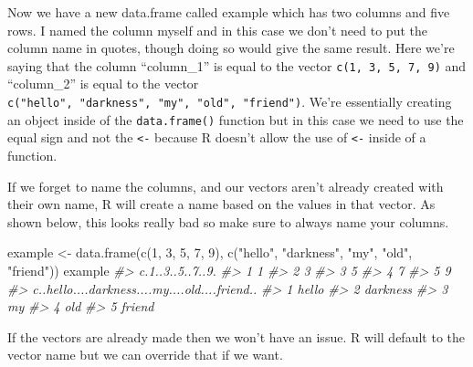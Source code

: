 \documentclass[
]{krantz}
\makeatletter
\newenvironment{Shaded}{\begin{snugshade}}{\end{snugshade}}
\newcommand{\CommentTok}[1]{\textcolor[rgb]{0.37,0.37,0.37}{\textit{#1}}}
\newcommand{\DecValTok}[1]{\textcolor[rgb]{0.06,0.06,0.06}{#1}}
\newcommand{\FunctionTok}[1]{\textcolor[rgb]{0,0,0}{#1}}
\newcommand{\NormalTok}[1]{#1}
\newcommand{\OtherTok}[1]{\textcolor[rgb]{0.37,0.37,0.37}{#1}}
\newcommand{\StringTok}[1]{\textcolor[rgb]{0.5,0.5,0.5}{#1}}
\newenvironment{kframe}{%
\medskip{}
\setlength{\fboxsep}{.8em}
 \def\at@end@of@kframe{}%
 \ifinner\ifhmode%
  \def\at@end@of@kframe{\end{minipage}}%
  \begin{minipage}{\columnwidth}%
 \fi\fi%
 \def\FrameCommand##1{\hskip\@totalleftmargin \hskip-\fboxsep
 \colorbox{shadecolor}{##1}\hskip-\fboxsep
     \hskip-\linewidth \hskip-\@totalleftmargin \hskip\columnwidth}%
 \MakeFramed {\advance\hsize-\width
   \@totalleftmargin\z@ \linewidth\hsize
   \@setminipage}}%
 {\par\unskip\endMakeFramed%
 \at@end@of@kframe}
\renewenvironment{Shaded}{\begin{kframe}}{\end{kframe}}
\makeatother
\begin{document}
Now we have a new data.frame called example which has two columns and five rows. I named the column myself and in this case we don't need to put the column name in quotes, though doing so would give the same result. Here we're saying that the column ``column\_1'' is equal to the vector \texttt{c(1,\ 3,\ 5,\ 7,\ 9)} and ``column\_2'' is equal to the vector \texttt{c("hello",\ "darkness",\ "my",\ "old",\ "friend")}. We're essentially creating an object inside of the \texttt{data.frame()} function but in this case we need to use the equal sign and not the \texttt{\textless{}-} because R doesn't allow the use of \texttt{\textless{}-} inside of a function.

If we forget to name the columns, and our vectors aren't already created with their own name, R will create a name based on the values in that vector. As shown below, this looks really bad so make sure to always name your columns.

\begin{Shaded}
\begin{Highlighting}[]
\NormalTok{example }\OtherTok{\textless{}{-}} \FunctionTok{data.frame}\NormalTok{(}\FunctionTok{c}\NormalTok{(}\DecValTok{1}\NormalTok{, }\DecValTok{3}\NormalTok{, }\DecValTok{5}\NormalTok{, }\DecValTok{7}\NormalTok{, }\DecValTok{9}\NormalTok{),}
                      \FunctionTok{c}\NormalTok{(}\StringTok{"hello"}\NormalTok{, }\StringTok{"darkness"}\NormalTok{, }\StringTok{"my"}\NormalTok{, }\StringTok{"old"}\NormalTok{, }\StringTok{"friend"}\NormalTok{))}
\NormalTok{example}
\CommentTok{\#\textgreater{}   c.1..3..5..7..9.}
\CommentTok{\#\textgreater{} 1                1}
\CommentTok{\#\textgreater{} 2                3}
\CommentTok{\#\textgreater{} 3                5}
\CommentTok{\#\textgreater{} 4                7}
\CommentTok{\#\textgreater{} 5                9}
\CommentTok{\#\textgreater{}   c..hello....darkness....my....old....friend..}
\CommentTok{\#\textgreater{} 1                                         hello}
\CommentTok{\#\textgreater{} 2                                      darkness}
\CommentTok{\#\textgreater{} 3                                            my}
\CommentTok{\#\textgreater{} 4                                           old}
\CommentTok{\#\textgreater{} 5                                        friend}
\end{Highlighting}
\end{Shaded}

If the vectors are already made then we won't have an issue. R will default to the vector name but we can override that if we want.
\end{document}
